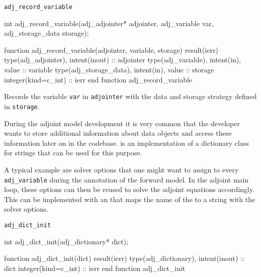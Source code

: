 \begin{boxwithtitle}{\texttt{adj_record_variable}}
\begin{minipage}{\columnwidth}
\begin{ccode}
  int adj_record_variable(adj_adjointer* adjointer, adj_variable var, 
                          adj_storage_data storage);
\end{ccode}
\begin{fortrancode}
  function adj_record_variable(adjointer, variable, storage) result(ierr) 
    type(adj_adjointer), intent(inout) :: adjointer
    type(adj_variable), intent(in), value :: variable
    type(adj_storage_data), intent(in), value :: storage
    integer(kind=c_int) :: ierr
  end function adj_record_variable
\end{fortrancode}
\end{minipage}
\end{boxwithtitle}

Records the variable \texttt{var} in \texttt{adjointer} with the data and storage strategy defined in \texttt{storage}.



During the adjoint model development it is very common that the developer wants to store additional information about \libadjoint data objects 
and access these information later on in the codebase.
 is an implementation of a dictionary class for strings that can be used for this purpose.

A typical example are solver options that one might want to assign to every \texttt{adj_variable} during the annotation of the forward model.
In the adjoint main loop, these options can then be reused to solve the adjoint equations accordingly.
This can be implemented with an  that maps the name of the  to a string with the solver options.

\begin{boxwithtitle}{\texttt{adj_dict_init}}
\begin{minipage}{\columnwidth}
\begin{ccode}
  int adj_dict_init(adj_dictionary* dict);
\end{ccode}
\begin{fortrancode}
  function adj_dict_init(dict) result(ierr)
    type(adj_dictionary), intent(inout) :: dict
    integer(kind=c_int) :: ierr
  end function adj_dict_init
\end{fortrancode}
\end{minipage}
\end{boxwithtitle}

